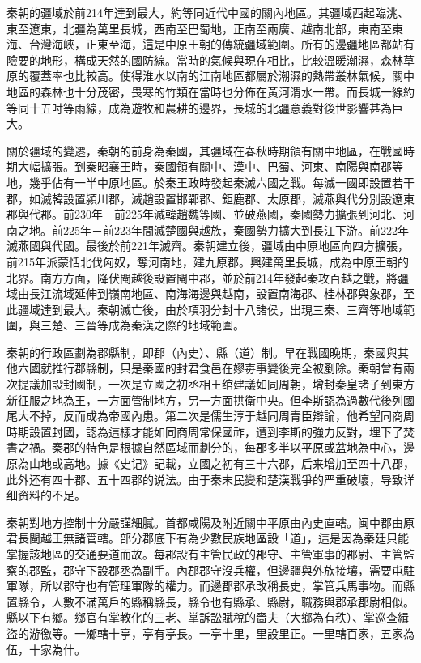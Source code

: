 秦朝的疆域於前214年達到最大，約等同近代中國的關內地區。其疆域西起臨洮、東至遼東，北疆為萬里長城，西南至巴蜀地，正南至兩廣、越南北部，東南至東海、台灣海峽，正東至海，這是中原王朝的傳統疆域範圍。所有的邊疆地區都站有險要的地形，構成天然的國防線。當時的氣候與現在相比，比較溫暖潮濕，森林草原的覆蓋率也比較高。使得淮水以南的江南地區都屬於潮濕的熱帶叢林氣候，關中地區的森林也十分茂密，畏寒的竹類在當時也分佈在黃河渭水一帶。而長城一線約等同十五吋等雨線，成為遊牧和農耕的邊界，長城的北疆意義對後世影響甚為巨大。

關於疆域的變遷，秦朝的前身為秦國，其疆域在春秋時期領有關中地區，在戰國時期大幅擴張。到秦昭襄王時，秦國領有關中、漢中、巴蜀、河東、南陽與南郡等地，幾乎佔有一半中原地區。於秦王政時發起秦滅六國之戰。每滅一國即設置若干郡，如滅韓設置潁川郡，滅趙設置邯鄲郡、鉅鹿郡、太原郡，滅燕與代分別設遼東郡與代郡。前230年－前225年滅韓趙魏等國、並破燕國，秦國勢力擴張到河北、河南之地。前225年－前223年間滅楚國與越族，秦國勢力擴大到長江下游。前222年滅燕國與代國。最後於前221年滅齊。秦朝建立後，疆域由中原地區向四方擴張，前215年派蒙恬北伐匈奴，奪河南地，建九原郡。興建萬里長城，成為中原王朝的北界。南方方面，降伏閩越後設置閩中郡，並於前214年發起秦攻百越之戰，將疆域由長江流域延伸到嶺南地區、南海海邊與越南，設置南海郡、桂林郡與象郡，至此疆域達到最大。秦朝滅亡後，由於項羽分封十八諸侯，出現三秦、三齊等地域範圍，與三楚、三晉等成為秦漢之際的地域範圍。

秦朝的行政區劃為郡縣制，即郡（內史）、縣（道）制。早在戰國晚期，秦國與其他六國就推行郡縣制，只是秦國的封君食邑在嫪毐事變後完全被剷除。秦朝曾有兩次提議加設封國制，一次是立國之初丞相王绾建議如同周朝，增封秦皇諸子到東方新征服之地為王，一方面管制地方，另一方面拱衛中央。但李斯認為過數代後列國尾大不掉，反而成為帝國內患。第二次是儒生淳于越同周青臣辯論，他希望同商周時期設置封國，認為這樣才能如同商周常保國祚，遭到李斯的強力反對，埋下了焚書之禍。秦郡的特色是根據自然區域而劃分的，每郡多半以平原或盆地為中心，邊原為山地或高地。據《史记》記載，立國之初有三十六郡，后来增加至四十八郡，此外还有四十郡、五十四郡的说法。由于秦末民變和楚漢戰爭的严重破壞，导致详细资料的不足。

秦朝對地方控制十分嚴謹細膩。首都咸陽及附近關中平原由內史直轄。闽中郡由原君長閩越王無諸管轄。部分郡底下有為少數民族地區設「道」，這是因為秦廷只能掌握該地區的交通要道而故。每郡設有主管民政的郡守、主管軍事的郡尉、主管監察的郡監，郡守下設郡丞為副手。內郡郡守沒兵權，但邊疆與外族接壤，需要屯駐軍隊，所以郡守也有管理軍隊的權力。而邊郡郡承改稱長史，掌管兵馬事物。而縣置縣令，人數不滿萬戶的縣稱縣長，縣令也有縣承、縣尉，職務與郡承郡尉相似。縣以下有鄉。鄉官有掌教化的三老、掌訴訟賦稅的嗇夫（大鄉為有秩）、掌巡查緝盜的游徼等。一鄉轄十亭，亭有亭長。一亭十里，里設里正。一里轄百家，五家為伍，十家為什。

